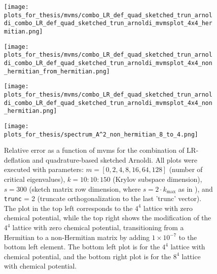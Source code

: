 \begin{figure}[H]
    \centering
    \begin{minipage}{0.45\textwidth}
        \centering
        \texttt{[image: plots\_for\_thesis/mvms/combo\_LR\_def\_quad\_sketched\_trun\_arnoldi\_combo\_LR\_def\_quad\_sketched\_trun\_arnoldi\_mvmsplot\_4x4\_hermitian.png]} %
    \end{minipage}%
    \hspace{0.02\textwidth} %
    \begin{minipage}{0.45\textwidth}
        \centering
        \texttt{[image: plots\_for\_thesis/mvms/combo\_LR\_def\_quad\_sketched\_trun\_arnoldi\_combo\_LR\_def\_quad\_sketched\_trun\_arnoldi\_mvmsplot\_4x4\_non\_hermitian\_from\_hermitian.png]} %
    \end{minipage}
    
    \vspace{0.02\textwidth} %
    
    \begin{minipage}{0.45\textwidth}
        \centering
        \texttt{[image: plots\_for\_thesis/mvms/combo\_LR\_def\_quad\_sketched\_trun\_arnoldi\_combo\_LR\_def\_quad\_sketched\_trun\_arnoldi\_mvmsplot\_4x4\_non\_hermitian.png]} %
    \end{minipage}%
    \hspace{0.02\textwidth} %
    \begin{minipage}{0.45\textwidth}
        \centering
        \texttt{[image: plots\_for\_thesis/spectrum\_A^2\_non\_hermitian\_8\_to\_4.png]} %
    \end{minipage}
    
    \caption{\small Relative error as a function of mvms for the combination of LR-deflation and quadrature-based sketched Arnoldi. All plots were executed with parameters: $m = [0, 2, 4, 8, 16, 64, 128]$ (number of critical eigenvalues), $k = 10:10:150$ (Krylov subspace dimension), $s = 300$ (sketch matrix row dimension, where $s = 2 \cdot k_{\text{max}}$ as in \cite{41}), and \texttt{trunc} = 2 (truncate orthogonalization to the last 'trunc' vector). The plot in the top left corresponds to the $4^4$ lattice with zero chemical potential, while the top right shows the modification of the $4^4$ lattice with zero chemical potential, transitioning from a Hermitian to a non-Hermitian matrix by adding $1 \times 10^{-7}$ to the bottom left element. The bottom left plot is for the $4^4$ lattice with chemical potential, and the bottom right plot is for the $8^4$ lattice with chemical potential.}
    \label{fig:combo_LR+skectched_arnoldi_mvms_plot}
\end{figure}

